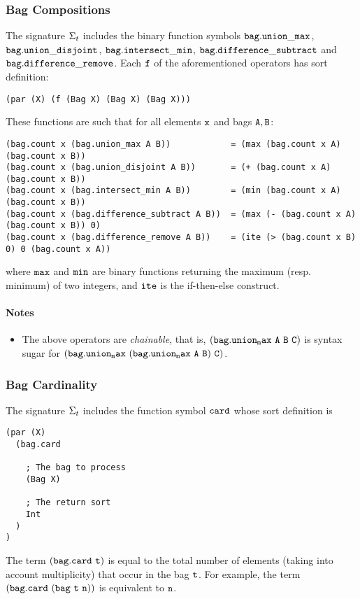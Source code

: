 \documentclass[english,a4paper,10pt]{article}
\begin{document}
\subsubsection{Bag Compositions}
\label{sec:bag-compositions}
The signature $\Sigma_{t}$ includes 
the binary function symbols 
${\tt bag.union\_max}$, ${\tt bag.union\_disjoint}$, 
${\tt bag.intersect\_min}$, ${\tt bag.difference\_subtract}$ and
${\tt bag.difference\_remove}$.
Each ${\tt f}$ of the aforementioned operators
has sort definition:
\begin{verbatim}
(par (X) (f (Bag X) (Bag X) (Bag X)))
\end{verbatim}
These functions are such that for all elements ${\tt x}$
and bags ${\tt A,B}$:
\begin{verbatim}
(bag.count x (bag.union_max A B))            = (max (bag.count x A) (bag.count x B))
(bag.count x (bag.union_disjoint A B))       = (+ (bag.count x A) (bag.count x B))
(bag.count x (bag.intersect_min A B))        = (min (bag.count x A) (bag.count x B))
(bag.count x (bag.difference_subtract A B))  = (max (- (bag.count x A) (bag.count x B)) 0)
(bag.count x (bag.difference_remove A B))    = (ite (> (bag.count x B) 0) 0 (bag.count x A))
\end{verbatim}
where ${\tt max}$ and ${\tt min}$ are binary functions
returning the maximum (resp. minimum) of two integers, and ${\tt ite}$
is the if-then-else construct.

\paragraph{Notes}
\begin{itemize}
\item
The above operators are \emph{chainable}, that is,
${\tt (bag.union_max\ A\ B\ C)}$ is syntax sugar for
$\syntax{(bag.union_max\ (bag.union_max\ A\ B)\ C)}$.
\end{itemize}

\subsubsection{Bag Cardinality}
The signature $\Sigma_{t}$ includes 
the function symbol ${\tt card}$ whose sort definition is
\begin{verbatim}
(par (X) 
  (bag.card 
  
    ; The bag to process
    (Bag X) 
    
    ; The return sort
    Int
  )
)
\end{verbatim}
The term ${\tt (bag.card\ t)}$ is equal to
the total number of elements (taking into account multiplicity)
that occur in the bag ${\tt t}$.
For example, the term $\syntax{(bag.card\ (bag\ t\ n))}$ is
equivalent to ${\tt n}$.
\end{document}
